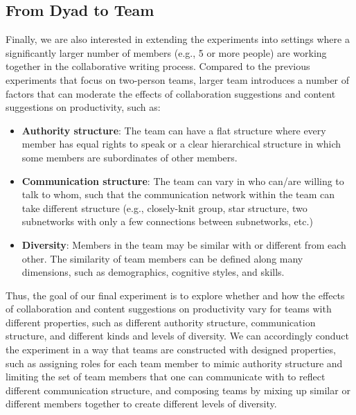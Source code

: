  


\subsection{From Dyad to Team}
\label{sec:exp4}
Finally, we are also interested in extending the experiments into 
settings where 
a significantly larger number of members (e.g., 5 or more people) are working together in the collaborative writing process. Compared to the previous experiments that focus on two-person teams, larger team introduces a number of factors that can 
moderate the effects of collaboration suggestions and content suggestions on %
productivity, such as:
\begin{itemize}[leftmargin=*,noitemsep,topsep=0pt,parsep=0pt,partopsep=0pt]
\item{\bf Authority structure}: The team can have a flat structure where every member has equal rights to speak or a clear hierarchical structure in which some members are subordinates of other members.
\item{\bf Communication structure}: The team can vary in who can/are willing to talk to whom, such that the communication network within the team can take different structure (e.g., closely-knit group, star structure, two subnetworks with only a few connections between subnetworks, etc.) 
\item{\bf Diversity}: Members in the team may be similar with or different from each other. The similarity of team members can be defined along many dimensions, such as demographics, cognitive styles, and skills.
\end{itemize}

Thus, the goal of our final experiment is to explore whether and how the effects of collaboration and content suggestions on productivity vary for teams with different properties, such as different authority structure, communication structure, and different kinds and levels of diversity. 
We can accordingly conduct the experiment in a way that teams are constructed with designed properties, such as assigning roles for each team member to mimic authority structure and limiting the set of team members that one can communicate with to reflect different communication structure, and composing teams by mixing up similar or different members together to create different levels of diversity. 
